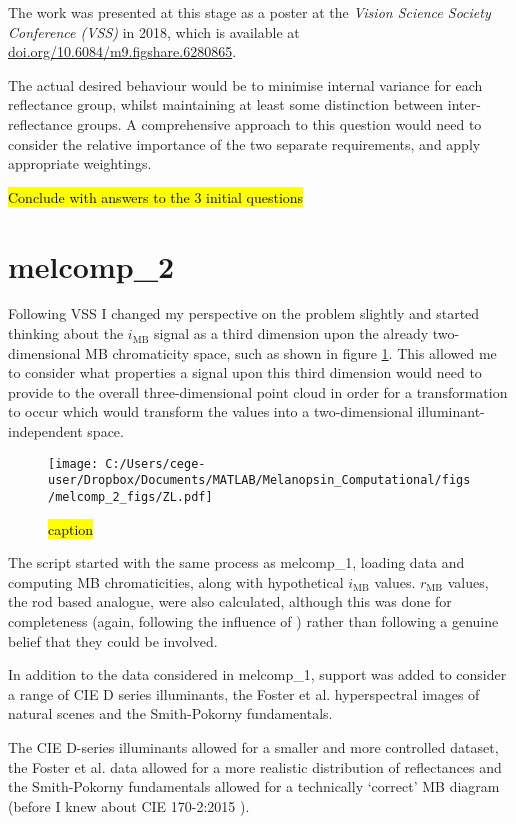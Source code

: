 The work was presented at this stage as a poster at the \emph{Vision Science Society Conference (VSS)} in 2018, which is available at \url{doi.org/10.6084/m9.figshare.6280865}.

The actual desired behaviour would be to minimise internal variance for each reflectance group, whilst maintaining at least some distinction between inter-reflectance groups. A comprehensive approach to this question would need to consider the relative importance of the two separate requirements, and apply appropriate weightings.

\hl{Conclude with answers to the 3 initial questions}

\section{melcomp\_2}

Following VSS I changed my perspective on the problem slightly and started thinking about the $i_{\text{MB}}$ signal as a third dimension upon the already two-dimensional \gls{MB} chromaticity space, such as shown in figure \ref{fig:ZL}. This allowed me to consider what properties a signal upon this third dimension would need to provide to the overall three-dimensional point cloud in order for a transformation to occur which would transform the values into a two-dimensional illuminant-independent space.

\begin{figure}[h]
    \centering
    \texttt{[image: C:/Users/cege-user/Dropbox/Documents/MATLAB/Melanopsin\_Computational/figs/melcomp\_2\_figs/ZL.pdf]}
    \caption{\hl{caption}}
    \label{fig:ZL}
\end{figure} 

The script started with the same process as melcomp\_1, loading data and computing \gls{MB} chromaticities, along with hypothetical $i_{\text{MB}}$ values. $r_{\text{MB}}$ values, the rod based analogue, were also calculated, although this was done for completeness (again, following the influence of \cite{barrionuevo_contributions_2014}) rather than following a genuine belief that they could be involved.

In addition to the data considered in melcomp\_1, support was added to consider a range of CIE D series illuminants, the Foster et al. hyperspectral images of natural scenes and the Smith-Pokorny fundamentals.

The CIE D-series illuminants allowed for a smaller and more controlled dataset, the Foster et al. data allowed for a more realistic distribution of reflectances and the Smith-Pokorny fundamentals allowed for a technically `correct' \gls{MB} diagram (before I knew about CIE 170-2:2015 \cite{cie_cie_2015}).


